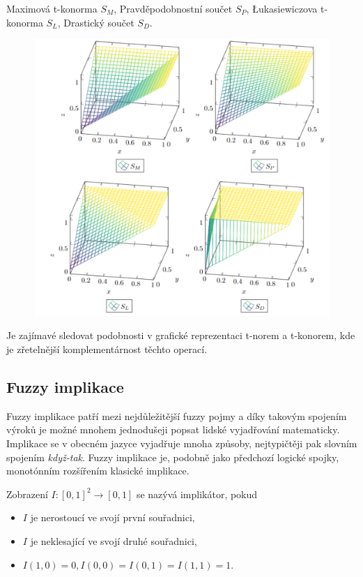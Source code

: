 \begin{graph} Maximová t-konorma $S_M$, Pravděpodobnostní součet $S_P$, Łukasiewiczova t-konorma $S_L$, Drastický součet $S_D$.\\

   \begin{figure}[H]
                \hspace{-1cm}
                \includegraphics[scale=0.7]{template-fig/konormy.pdf}
                \centering
            \end{figure}

\end{graph}

Je zajímavé sledovat podobnosti v grafické reprezentaci t-norem a t-konorem, kde je zřetelnější komplementárnost těchto operací.

\subsection{Fuzzy implikace} 


Fuzzy implikace patří mezi nejd\r uležitější fuzzy pojmy a díky takovým spojením výrok\r u je možné mnohem jednodušeji popsat lidské vyjadřování matematicky. Implikace se v obecném jazyce vyjadřuje mnoha zp\r usoby, nejtypičtěji pak slovním spojením \textit{když-tak}. Fuzzy implikace je, podobn\v e jako p\v redchoz\'i logick\'e spojky, monot\'onn\'im roz\v s\'i\v ren\'im klasick\'e implikace.
\begin{definition} \label{impl}
    Zobrazení $I: [0,1]^2 \rightarrow [0,1] $ se nazývá implikátor, pokud
    \begin{itemize}
        \item $I$ je nerostoucí ve svojí první souřadnici,
        \item $I$ je neklesající ve svojí druhé souřadnici,
        \item $I(1,0) = 0, I(0,0) =  I(0,1) = I(1,1) = 1.$
    \end{itemize}
\end{definition}

